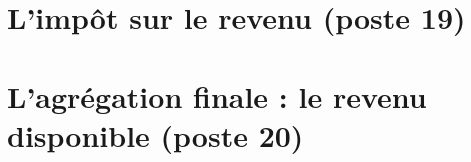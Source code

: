\documentclass[]{fairmeta}
\begin{document}






\section{L'impôt sur le revenu (poste 19)}
\label{sec:impots}


\section{L'agrégation finale : le revenu disponible (poste 20)}
\label{sec:rd}



\end{document}

